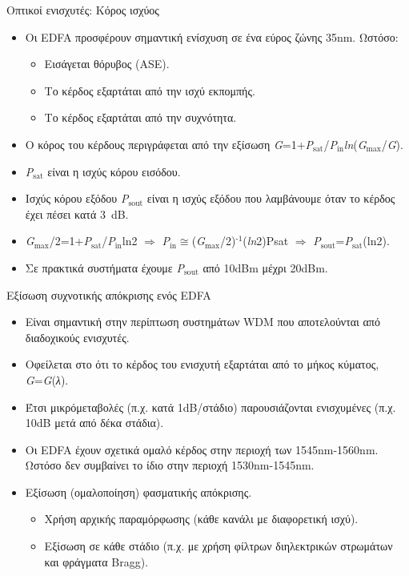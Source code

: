 \documentclass[11pt,aspectratio=169]{beamer}
\begin{document}
\begin{frame}[shrink=20,t]{Οπτικοί ενισχυτές: Κόρος ισχύος}
\begin{itemize}
\item Οι EDFA προσφέρουν σημαντική ενίσχυση σε ένα εύρος ζώνης 35nm. Ωστόσο:
\begin{itemize}
\item Εισάγεται θόρυβος (ASE).
\item Το κέρδος εξαρτάται από την ισχύ εκπομπής.
\item Το κέρδος εξαρτάται από την συχνότητα.
\end{itemize}
\item Ο κόρος του κέρδους περιγράφεται από την εξίσωση \textit{G}=1+\textit{P}$_{\text{sat}}$/\textit{P}$_{\text{in}}$\textit{ln}(\textit{G}$_{\text{max}}$/\textit{G}).
\item \textit{P}$_{\text{sat}}$ είναι η ισχύς κόρου εισόδου.
\item Ισχύς κόρου εξόδου \textit{P}$_{\text{sout}}$ είναι η ισχύς εξόδου που λαμβάνουμε όταν το κέρδος έχει πέσει κατά 3~dB.
\item \textit{G}$_{\text{max}}$/2=1+\textit{P}$_{\text{sat}}$/\textit{P}$_{\text{in}}$ln2 \ensuremath{\Rightarrow} \textit{P}$_{\text{in}}$\ensuremath{\cong}(\textit{G}$_{\text{max}}$/2)$^{\text{-1}}$(\textit{ln}2)Psat \ensuremath{\Rightarrow} \textit{P}$_{\text{sout}}$=\textit{P}$_{\text{sat}}$(ln2).
\item Σε πρακτικά συστήματα έχουμε \textit{P}$_{\text{sout}}$ από 10dBm μέχρι 20dBm.
\end{itemize}
\end{frame}

\begin{frame}[shrink=10,t]{Εξίσωση συχνοτικής απόκρισης ενός EDFA}
\begin{itemize}
\item Είναι σημαντική στην περίπτωση συστημάτων WDM που αποτελούνται από διαδοχικούς ενισχυτές.
\item Οφείλεται στο ότι το κέρδος του ενισχυτή εξαρτάται από το μήκος κύματος, \textit{G}=\textit{G}(\textit{λ}).
\item Έτσι μικρόμεταβολές (π.χ. κατά 1dB/στάδιο) παρουσιάζονται ενισχυμένες (π.χ. 10dB μετά από δέκα στάδια).
\item Οι EDFA έχουν σχετικά ομαλό κέρδος στην περιοχή των 1545nm-1560nm. Ωστόσο δεν συμβαίνει το ίδιο στην περιοχή 1530nm-1545nm.
\item Εξίσωση (ομαλοποίηση) φασματικής απόκρισης.
\begin{itemize}
\item Χρήση αρχικής παραμόρφωσης (κάθε κανάλι με διαφορετική ισχύ).
\item Εξίσωση σε κάθε στάδιο (π.χ. με χρήση φίλτρων διηλεκτρικών στρωμάτων και φράγματα Bragg).
\end{itemize}
\end{itemize}
\end{frame}
\end{document}
